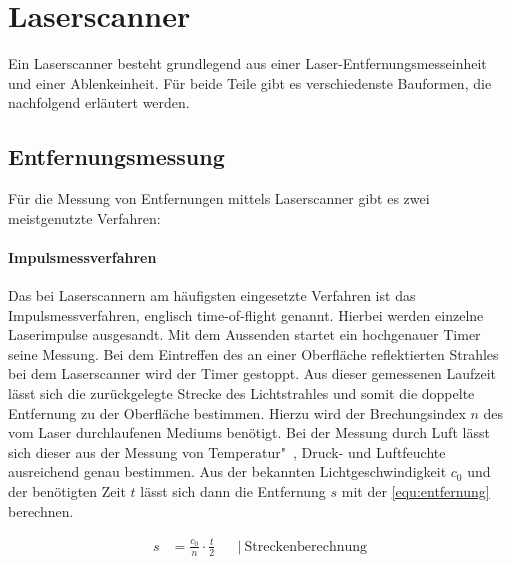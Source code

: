 \documentclass[a4paper,12pt,bibliography=totoc, listof=totoc,titlepage,pointlessnumbers]{scrreprt}
\begin{document}
\section{Laser\-scan\-ner}
Ein Laser\-scan\-ner besteht grundlegend aus einer Laser-Entfernungsmesseinheit und einer Ablenkeinheit. Für beide Teile gibt es verschiedenste Bauformen, die nachfolgend erläutert werden.

\subsection{Entfernungsmessung}
Für die Messung von Entfernungen mittels Laser\-scan\-ner gibt es zwei meistgenutzte Verfahren:

\paragraph{Impulsmessverfahren}
\label{p:tof}
Das bei Laser\-scan\-nern am häufigsten eingesetzte Verfahren ist das Impulsmessverfahren, englisch time-of-flight genannt. Hierbei werden einzelne Laserimpulse ausgesandt. Mit dem Aussenden startet ein hochgenauer Timer seine Messung. Bei dem Eintreffen des an einer Oberfläche reflektierten Strahles bei dem Laser\-scan\-ner wird der Timer gestoppt. Aus dieser gemessenen Laufzeit lässt sich die zurückgelegte Strecke des Lichtstrahles und somit die doppelte Entfernung zu der Oberfläche bestimmen. Hierzu wird der Brechungsindex \(n\) des vom Laser durchlaufenen Mediums benötigt. Bei der Messung durch Luft lässt sich dieser aus der Messung von Temperatur"~, Druck- und Luftfeuchte ausreichend genau bestimmen. Aus der bekannten Lichtgeschwindigkeit \(c_0\) und der benötigten Zeit \(t\) lässt sich dann die Entfernung \(s\) mit der \autoref{equ:entfernung} berechnen.

\begin{equation}
\begin{aligned}
s &=  \frac{c_0}{n} \cdot \frac{t}{2}  && \left|\  \text{Streckenberechnung} \right. \\
\end{aligned}
\label{equ:entfernung}
\end{equation}
\end{document}

